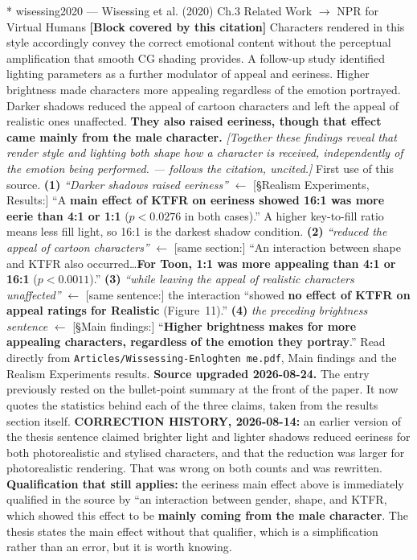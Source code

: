 \documentclass[11pt, a4paper]{article}
\makeatletter
\newcounter{citentry}
\newcommand{\citentry@core}[7]{%
  \stepcounter{citentry}
  \begingroup
  \sbox{\citentry@measurebox}{%
    \begin{minipage}{\linewidth}
      \noindent\colorbox{konstanzblue}{\parbox{\dimexpr\linewidth-2\fboxsep}{%
        \vspace{3pt}
        \textbf{\#\thecitentry \quad #2} \hfill \textit{#3}
        \vspace{3pt}
      }}
      \vspace{3pt}
      \noindent\begin{tabular}{@{}p{2.7cm} p{\dimexpr\linewidth-3cm}@{}}
        \textit{\small Sentence in thesis:} & #4 \\[5pt]
        \textbf{Usage:}\hfill       & #5 \\[5pt]
        \textit{\small Original source:}     & #6 \\[5pt]
        \textbf{How to check:}             & #7 \\
      \end{tabular}
      \vspace{5pt}
      \rule{10pt}{10pt}\quad \textbf{Validated} --- I have read the original and agree it supports the sentence.
    \end{minipage}%
  }%
  \Needspace{\dimexpr\ht\citentry@measurebox+\dp\citentry@measurebox\relax}%
  \endgroup
  \vspace{10pt}
  \noindent\colorbox{konstanzblue}{\parbox{\dimexpr\linewidth-2\fboxsep}{%
    \vspace{3pt}
    \textcolor{white}{\textbf{\#\thecitentry \quad #2}} \hfill \textcolor{white}{\textit{#3}}
    \vspace{3pt}
  }}
  \vspace{3pt}
  \noindent\begin{tabular}{@{}p{2.7cm} p{\dimexpr\linewidth-3cm}@{}}
    \textit{\small Sentence in thesis:} & \textcolor{darkgreen}{#4} \\[5pt]
    \textbf{Usage:}\hfill       & #5 \\[5pt]
    \textit{\small Original source:}     & \textcolor{darkred}{#6} \\[5pt]
    \textbf{How to check:}             & #7 \\
  \end{tabular}
  \vspace{5pt}
  \noindent\CheckBox[name=verified\thecitentry, width=10pt, height=10pt, bordercolor={0 0 0}, borderwidth=0.75, backgroundcolor={1 1 1}#1]{}\quad \textbf{Validated} --- I have read the original and agree it supports the sentence.
  \vspace{3pt}
  \noindent\textcolor{midgray}{\rule{\linewidth}{0.4pt}}
}
\newcommand{\citentry}{\@ifstar{\citentry@core{, checked}}{\citentry@core{}}}
\makeatother
\begin{document}
\begin{Form}
\citentry*
  {wisessing2020 --- Wisessing et al. (2020)}
  {Ch.3 Related Work $\rightarrow$ NPR for Virtual Humans}
  {\textbf{[Block covered by this citation]} Characters rendered in this style accordingly convey the correct emotional content without the perceptual amplification that smooth CG shading provides. A follow-up study identified lighting parameters as a further modulator of appeal and eeriness. Higher brightness made characters more appealing regardless of the emotion portrayed. Darker shadows reduced the appeal of cartoon characters and left the appeal of realistic ones unaffected. \textbf{They also raised eeriness, though that effect came mainly from the male character.} \emph{[Together these findings reveal that render style and lighting both shape how a character is received, independently of the emotion being performed. --- follows the citation, uncited.]}}
  {First use of this source.}
  {\textbf{(1)} \emph{``Darker shadows raised eeriness''} $\leftarrow$ [\S Realism Experiments, Results:] ``A \textbf{main effect of KTFR on eeriness showed 16:1 was more eerie than 4:1 or 1:1} ($p < 0.0276$ in both cases).'' A higher key-to-fill ratio means less fill light, so 16:1 is the darkest shadow condition. \quad \textbf{(2)} \emph{``reduced the appeal of cartoon characters''} $\leftarrow$ [same section:] ``An interaction between shape and KTFR also occurred\ldots \textbf{For Toon, 1:1 was more appealing than 4:1 or 16:1} ($p < 0.0011$).'' \quad \textbf{(3)} \emph{``while leaving the appeal of realistic characters unaffected''} $\leftarrow$ [same sentence:] the interaction ``showed \textbf{no effect of KTFR on appeal ratings for Realistic} (Figure~11).'' \quad \textbf{(4)} \emph{the preceding brightness sentence} $\leftarrow$ [\S Main findings:] ``\textbf{Higher brightness makes for more appealing characters, regardless of the emotion they portray}.''}
  {Read directly from \texttt{\footnotesize Articles/Wissessing-Enloghten me.pdf}, Main findings and the Realism Experiments results. \textbf{Source upgraded 2026-08-24.} The entry previously rested on the bullet-point summary at the front of the paper. It now quotes the statistics behind each of the three claims, taken from the results section itself. \textbf{CORRECTION HISTORY, 2026-08-14:} an earlier version of the thesis sentence claimed brighter light and lighter shadows reduced eeriness for both photorealistic and stylised characters, and that the reduction was larger for photorealistic rendering. That was wrong on both counts and was rewritten. \textbf{Qualification that still applies:} the eeriness main effect above is immediately qualified in the source by ``an interaction between gender, shape, and KTFR, which showed this effect to be \textbf{mainly coming from the male character}. The thesis states the main effect without that qualifier, which is a simplification rather than an error, but it is worth knowing.}


\end{Form}
\end{document}
